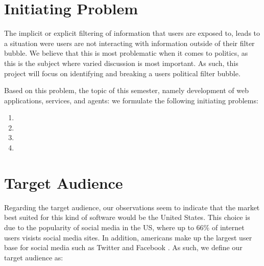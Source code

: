 \section{Initiating Problem} 
The implicit or explicit filtering of information that users are exposed to,
leads to a situation were users are not interacting with information outside of
their filter bubble. We believe that this is most problematic when it
comes to politics, as this is the subject where varied discussion is
most important. As such, this project will focus on identifying and breaking a
users political filter bubble.\nl

Based on this problem, the topic of this semester, namely development of web
applications, services, and agents: we formulate the following initiating
problems:

\begin{center}
\begin{minipage}{0.95\linewidth}

\begin{enumerate}
  \item {}
  
  \item {}
  
  \item {}
  
  \item {}
  
\end{enumerate}
\end{minipage}
\end{center}

\section{Target Audience}\label{sec:target}
Regarding the target audience, our observations seem to indicate that the market
best suited for this kind of software would be the United States. This choice is
due to the popularity of social media in the US, where up to 66\% of internet
users visists social media sites\citep{socialMediaActivity}.
In addition, americans make up the largest user base for social media such as
Twitter and Facebook \citep{socialMediaUsersTwitter, socialMediaUsersFacebook}.
As such, we define our target audience as: 
